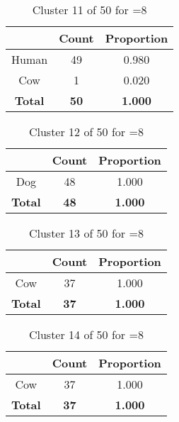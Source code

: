 \begin{table}[ht!]
\centering
\begin{tabular}{|c|c|c|}
\hline
\bf \Spec{} &\bf Count &\bf Proportion\\ \hline \hline
Human & 49 & 0.980\\ \hline
Cow & 1 & 0.020\\ \hline
\hline
\bf Total & \bf 50 & \bf 1.000\\ \hline
\end{tabular}
\label{tab:cluster:11:8}
\caption{Cluster 11 of 50 for \minneigh{}=8}
\end{table}

\begin{table}[ht!]
\centering
\begin{tabular}{|c|c|c|}
\hline
\bf \Spec{} &\bf Count &\bf Proportion\\ \hline \hline
Dog & 48 & 1.000\\ \hline
\hline
\bf Total & \bf 48 & \bf 1.000\\ \hline
\end{tabular}
\label{tab:cluster:12:8}
\caption{Cluster 12 of 50 for \minneigh{}=8}
\end{table}

\begin{table}[ht!]
\centering
\begin{tabular}{|c|c|c|}
\hline
\bf \Spec{} &\bf Count &\bf Proportion\\ \hline \hline
Cow & 37 & 1.000\\ \hline
\hline
\bf Total & \bf 37 & \bf 1.000\\ \hline
\end{tabular}
\label{tab:cluster:13:8}
\caption{Cluster 13 of 50 for \minneigh{}=8}
\end{table}

\begin{table}[ht!]
\centering
\begin{tabular}{|c|c|c|}
\hline
\bf \Spec{} &\bf Count &\bf Proportion\\ \hline \hline
Cow & 37 & 1.000\\ \hline
\hline
\bf Total & \bf 37 & \bf 1.000\\ \hline
\end{tabular}
\label{tab:cluster:14:8}
\caption{Cluster 14 of 50 for \minneigh{}=8}
\end{table}

